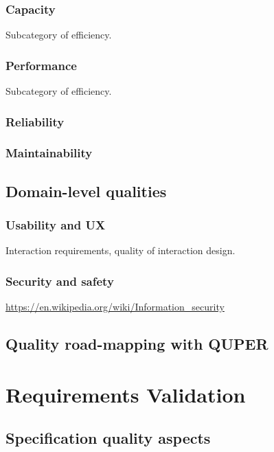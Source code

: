 \documentclass{reqengbook}
\begin{document}
\subsection{Capacity}
Subcategory of efficiency.

\subsection{Performance}
Subcategory of efficiency.

\subsection{Reliability}

\subsection{Maintainability}

\section{Domain-level qualities}

\subsection{Usability and UX}

Interaction requirements, quality of interaction design.

\subsection{Security and safety}

\url{https://en.wikipedia.org/wiki/Information_security}

\section{Quality road-mapping with QUPER}





\chapter{Requirements Validation}

\section{Specification quality aspects}
\end{document}
